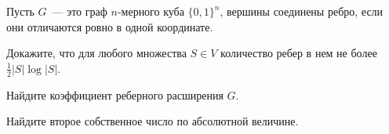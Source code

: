Пусть $G$~--- это граф $n$-мерного куба $\{0, 1\}^n$, вершины соединены ребро, если они отличаются ровно
в одной координате.
\begin{enumcyr}
    \item Докажите, что для любого множества $S \in V$ количество ребер в нем не более $\frac{1}{2} |S|
        \log |S|$.
    \item Найдите коэффициент реберного расширения $G$.
    \item Найдите второе собственное число по абсолютной величине.
\end{enumcyr}